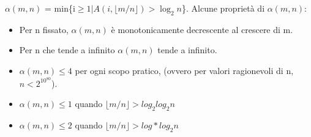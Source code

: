 \documentclass{article}
\begin{document}
 $\alpha(m,n)$ = min\{i$ \geq 1 | A(i, \lfloor m/n \rfloor) > \log_{2}n$\}.
 Alcune proprietà di $\alpha(m,n)$:
 \begin{itemize}
     \item Per n fissato,  $\alpha(m,n)$ è monotonicamente decrescente al crescere di m.
     \item Per n che tende a infinito  $\alpha(m,n)$ tende a infinito.
     \item  $\alpha(m,n) \leq 4$ per ogni scopo pratico, (ovvero per valori ragionevoli di n, $n < 2^{10^{80}}$).
     \item  $\alpha(m,n) \leq 1$ quando $\lfloor m/n \rfloor > log_{2}log_{2}n$  
     \item  $\alpha(m,n) \leq 2$ quando  $\lfloor m/n \rfloor > log*log_{2}n$
 \end{itemize}
\newpage
\end{document}
